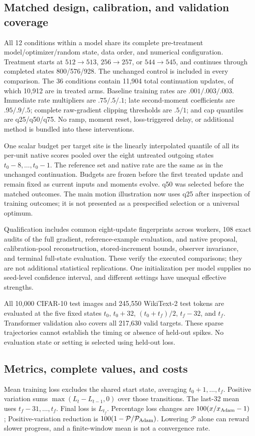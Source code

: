 \subsection{Matched design, calibration, and validation coverage}
All 12 conditions within a model share its complete pre-treatment model/optimizer/random state, data order, and numerical configuration. Treatment starts at $512\to513$, $256\to257$, or $544\to545$, and continues through completed states 800/576/928. The unchanged control is included in every comparison. The 36 conditions contain 11,904 total continuation updates, of which 10,912 are in treated arms. Baseline training rates are $.001/.003/.003$. Immediate rate multipliers are $.75/.5/.1$; late second-moment coefficients are $.95/.9/.5$; complete raw-gradient clipping thresholds are $.5/1$; and cap quantiles are q25/q50/q75. No ramp, moment reset, loss-triggered delay, or additional method is bundled into these interventions.

One scalar budget per target site is the linearly interpolated quantile of all its per-unit native scores pooled over the eight untreated outgoing states $t_0-8,\ldots,t_0-1$. The reference set and native rate are the same as in the unchanged continuation. Budgets are frozen before the first treated update and remain fixed as current inputs and moments evolve. q50 was selected before the matched outcomes. The main motion illustration now uses q25 after inspection of training outcomes; it is not presented as a prespecified selection or a universal optimum.

Qualification includes common eight-update fingerprints across workers, 108 exact audits of the full gradient, reference-example evaluation, and native proposal, calibration-pool reconstruction, stored-increment bounds, observer invariance, and terminal full-state evaluation. These verify the executed comparisons; they are not additional statistical replications. One initialization per model supplies no seed-level confidence interval, and different settings have unequal effective strengths.

All 10,000 CIFAR-10 test images and 245,550 WikiText-2 test tokens are evaluated at the five fixed states $t_0$, $t_0+32$, $(t_0+t_f)/2$, $t_f-32$, and $t_f$. Transformer validation also covers all 217,630 valid targets. These sparse trajectories cannot establish the timing or absence of held-out spikes. No evaluation state or setting is selected using held-out loss.

\subsection{Metrics, complete values, and costs}
Mean training loss excludes the shared start state, averaging $t_0+1,\ldots,t_f$. Positive variation sums $\max(L_t-L_{t-1},0)$ over those transitions. The last-32 mean uses $t_f-31,\ldots,t_f$. Final loss is $L_{t_f}$. Percentage loss changes are $100(x/x_{\rm Adam}-1)$; Positive-variation reduction is $100(1-\mathcal P/\mathcal P_{\rm Adam})$. Lowering $\mathcal P$ alone can reward slower progress, and a finite-window mean is not a convergence rate.

